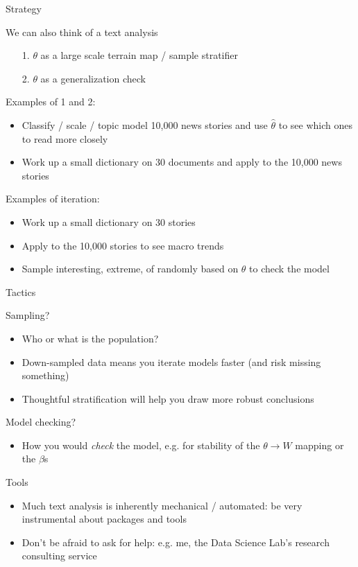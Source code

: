 \documentclass{hertieteaching}
\begin{document}
\begin{frame}{Strategy}

We can also think of a text analysis
\begin{itemize}
  \item[1.] $\theta$ as a large scale terrain map / sample stratifier
  \item[2.] $\theta$ as a generalization check
\end{itemize}
  
Examples of 1 and 2:
\begin{itemize}
  \item Classify / scale / topic model 10,000 news stories and use $\hat{\theta}$ to see which ones to read more closely 
  \item Work up a small dictionary on 30 documents and
  apply to the 10,000 news stories 
\end{itemize}
  
Examples of iteration:
\begin{itemize}
  \item Work up a small dictionary on 30 stories
  \item Apply to the 10,000 stories to see macro trends
  \item Sample interesting, extreme, of randomly based on $\theta$ to check the model
\end{itemize}


  
\end{frame}

\begin{frame}{Tactics}

Sampling?
\begin{itemize}
  \item Who  or what is the population?
  \item Down-sampled data means you iterate models faster (and risk missing something)
  \item Thoughtful stratification will help you draw more robust conclusions
\end{itemize}

Model checking?
\begin{itemize}
  \item How you would \textit{check} the model, e.g. for stability
  of the $\theta \longrightarrow W$ mapping or the $\beta$s
\end{itemize}

Tools
\begin{itemize}
  \item Much text analysis is inherently mechanical / automated: 
  be very instrumental about packages and tools
  \item Don't be afraid to ask for help: e.g. me, the Data Science Lab's research consulting service
\end{itemize}

\end{frame}
\end{document}
